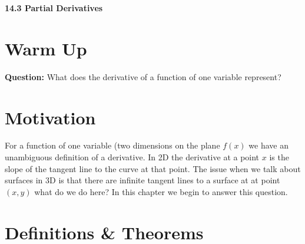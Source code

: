 \documentclass[11pt]{article}
\newcommand{\vs}{\vspace*{.1in}}
\begin{document}
\begin{LARGE}\begin{center}\bf 14.3 Partial Derivatives\end{center}
\end{LARGE}

\vs\vs



\section{Warm Up}
\textbf{Question:} What does the derivative of a function of one variable represent?



\section{Motivation}
For a function of one variable (two dimensions on the plane $f(x)$ we have an unambiguous definition of a derivative. In 2D the derivative at a point $x$ is the slope of the tangent line to the curve at that point. The issue when we talk about surfaces in 3D is that there are infinite tangent lines to a surface at at point $(x,y)$ what do we do here? In this chapter we begin to answer this question.


\section{Definitions \& Theorems}
\end{document}
